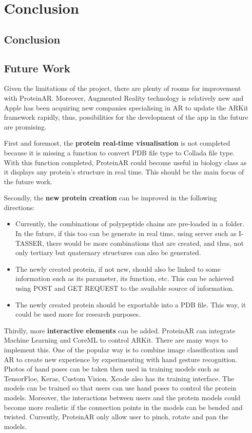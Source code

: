 \chapter{Conclusion}
\label{ch:conclusion}

\section{Conclusion}
\section{Future Work}
Given the limitations of the project, there are plenty of rooms for improvement with ProteinAR. Moreover, Augmented Reality technology is relatively new and Apple has been acquiring new companies specialising in AR to update the ARKit framework rapidly, thus, possibilities for the development of the app in the future are promising.

First and foremost, the \textbf{protein real-time visualisation} is not completed because it is missing a function to convert PDB file type to Collada file type. With this function completed, ProteinAR could become useful in biology class as it displays any protein's structure in real time. This should be the main focus of the future work.

Secondly, the \textbf {new protein creation} can be improved in the following directions:
\begin{itemize}
	\item Currently, the combinations of polypeptide chains are pre-loaded in a folder. In the future, if this too can be generate in real time, using server such as I-TASSER, there would be more combinations that are created, and thus, not only tertiary but quaternary structures can also be generated.
	\item The newly created protein, if not new, should also be linked to some information such as its parameter, its function, etc. This can be achieved using POST and GET REQUEST to the available source of information.
	\item The newly created protein should be exportable into a PDB file. This way, it could be used more for research purposes.
\end{itemize}

Thirdly, more \textbf{interactive elements} can be added. ProteinAR can integrate Machine Learning and CoreML to control ARKit. There are many ways to implement this. One of the popular way is to combine image classification and AR to create new experience by experimenting with hand gesture recognition. Photos of hand poses can be taken then used in training models such as TensorFloe, Keras, Custom Vision. Xcode also has its training interface. The models can be trained so that users can use hand poses to control the protein models. Moreover, the interactions between users and the protein models could become more realistic if the connection points in the models can be bended and twisted. Currently, ProteinAR only allow user to pinch, rotate and pan the models.
 
